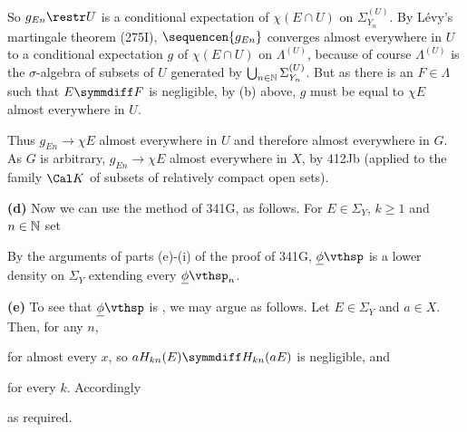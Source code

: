 {

\noindent So $g_{En}\restr U$ is a conditional expectation of
$\chi(E\cap U)$ on $\Sigma^{(U)}_{Y_n}$.   By L\'evy's martingale
theorem (275I), $\sequencen{g_{En}}$ converges almost everywhere in $U$
to a conditional expectation $g$ of $\chi(E\cap U)$ on $\Lambda^{(U)}$,
because of course $\Lambda^{(U)}$ is the $\sigma$-algebra of subsets of
$U$ generated by $\bigcup_{n\in\Bbb N}\Sigma^{(U)}_{Y_n}$.   But as
there is an $F\in\Lambda$ such that $E\symmdiff F$ is negligible, by (b)
above, $g$ must be equal to $\chi E$ almost everywhere in $U$.

Thus $g_{En}\to\chi E$ almost everywhere in $U$ and therefore almost
everywhere in $G$.   As $G$ is arbitrary, $g_{En}\to\chi E$ almost
everywhere in $X$, by 412Jb (applied to the family $\Cal K$ of subsets
of relatively compact open sets).\ \Qed

\medskip

{\bf (d)} Now we can use the method of 341G, as follows.   For
$E\in\Sigma_Y$, $k\ge 1$ and $n\in\Bbb N$ set



\noindent By the arguments of parts (e)-(i) of the proof of 341G,
$\undphi$ is a lower density on $\Sigma_Y$ extending every $\undphi_n$.

\medskip

{\bf (e)} To see that $\undphi$ is \lti, we may argue as follows.   Let
$E\in\Sigma_Y$ and $a\in X$.   Then, for any $n$,


\noindent for almost every $x$, so
$aH_{kn}(E)\symmdiff H_{kn}(aE)$ is negligible, and


\noindent for every $k$.   Accordingly



\noindent as required.
}%

